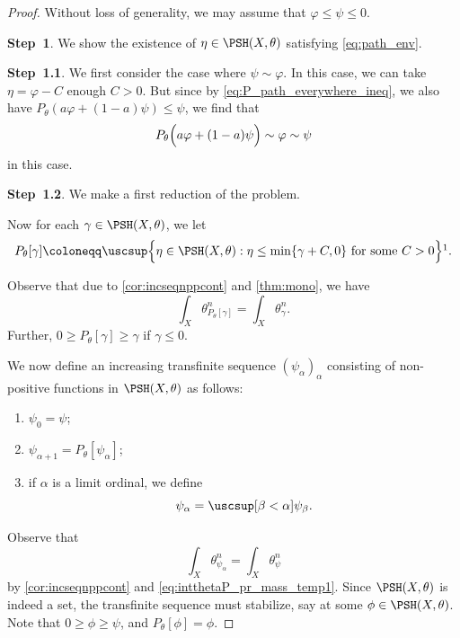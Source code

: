 \begin{proof}
    Without loss of generality, we may assume that $\varphi\leq \psi\leq 0$.

    \textbf{Step~1}. We show the existence of $\eta\in \PSH(X,\theta)$ satisfying \eqref{eq:path_env}.

    \textbf{Step~1.1}. We first consider the case where $\psi\sim \varphi$. In this case, we can take $\eta=\varphi-C$ enough $C>0$. But since by \eqref{eq:P_path_everywhere_ineq}, we also have $P_{\theta}(a\varphi+(1-a)\psi)\leq \psi$, we find that
    \[
        P_{\theta}\Bigl(a\varphi+(1-a)\psi\Bigr)\sim \varphi\sim \psi
    \]
    in this case.

    \textbf{Step~1.2}. We make a first reduction of the problem.

    Now for each $\gamma\in \PSH(X,\theta)$, we let
    \[
    P_{\theta}[\gamma]\coloneqq \uscsup\Bigl\{\eta\in \PSH(X,\theta): \eta\leq \min\{\gamma+C,0\}\textup{ for some }C>0 \Bigr\}\footnotemark.
    \]

    Observe that due to \cref{cor:incseqnppcont} and \cref{thm:mono}, we have
    \begin{equation}\label{eq:intthetaP_pr_mass_temp1}
    \int_X \theta_{P_{\theta}[\gamma]}^n=\int_X \theta_{\gamma}^n.
    \end{equation}
    Further, $0\geq P_{\theta}[\gamma]\geq \gamma$ if $\gamma\leq 0$.

    We now define an increasing transfinite sequence $(\psi_{\alpha})_{\alpha}$ consisting of non-positive functions in $\PSH(X,\theta)$ as follows:
    \begin{enumerate}
        \item\label{itm:chapter-npp:L766:1} $\psi_0=\psi$;
        \item\label{itm:chapter-npp:L766:2} $\psi_{\alpha+1}=P_{\theta}[\psi_{\alpha}]$;
        \item\label{itm:chapter-npp:L766:3} if $\alpha$ is a limit ordinal, we define
        \[
        \psi_{\alpha}=\uscsup[\beta<\alpha] \psi_{\beta}.
        \]
    \end{enumerate}
    Observe that
    \[
    \int_X \theta_{\psi_{\alpha}}^n=\int_X \theta_{\psi}^n
    \]
    by \cref{cor:incseqnppcont} and \eqref{eq:intthetaP_pr_mass_temp1}. Since $\PSH(X,\theta)$ is indeed a set, the transfinite sequence must stabilize, say at some $\phi\in \PSH(X,\theta)$.
    Note that $0 \geq \phi\geq \psi$, and $P_{\theta}[\phi]=\phi$.


\end{proof}
